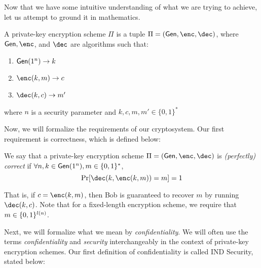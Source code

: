 Now that we have some intuitive understanding of what we are trying to achieve, let us attempt to ground it in mathematics.

\begin{definition}
    A private-key encryption scheme $\Pi$ is a tuple $\Pi = (\gen, \enc, \dec)$, where $\gen, \enc$, and $\dec$ are algorithms such that:
    \begin{enumerate}
        \item $\mathsf{Gen}(1^n) \rightarrow k$
        \item $\enc(k, m) \rightarrow c$
        \item $\dec(k, c) \rightarrow m'$
    \end{enumerate}
    
    where $n$ is a security parameter and $k, c, m, m' \in \{0, 1\}^*$
\end{definition}



\begin{comment}
$$\Pi = (Gen, Enc, Dec)$$
$$Gen(1^n) \rightarrow k$$
$$Enc(k, m) \rightarrow c$$
$$Dec(k, c) \rightarrow m'$$
\end{comment}



Now, we will formalize the requirements of our cryptosystem.
Our first requirement is correctness, which is defined below:

\begin{definition}
    We say that a private-key encryption scheme $\Pi = (\gen, \enc, \dec)$ is \emph{(perfectly) correct} if 
    $\forall n, k \in \mathsf{Gen}(1^n), m \in \{0,1\}^{*}$,
    $$\Pr[\dec(k,\enc(k,m)) = m] = 1$$
\end{definition}
That is, if $c = \enc(k, m)$, then Bob is guaranteed to recover $m$ by running $\dec(k, c)$. Note that for a fixed-length encryption scheme, we require that $m \in \{0,1\}^{l(n)}$.

Next, we will formalize what we mean by \textit{confidentiality}.
We will often use the terms \textit{confidentiality} and \textit{security} interchangeably in the context of private-key encryption schemes.
Our first definition of confidentiality is called IND Security, stated below:

